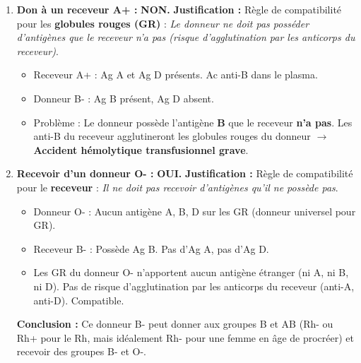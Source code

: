 \documentclass[11pt]{article}
\begin{document}
\begin{exoresolu}
\begin{enumerate}
\begin{itemize}
        \item Système Rhésus (allèles $D$ dominant sur $d$) : Phénotype Rh- ($dd$ seulement) $\rightarrow$ Génotype unique : \textbf{$dd$} (homozygote récessif).
    \end{itemize}
    \item \textbf{Don à un receveur A+ :} \textbf{NON.}
    \textbf{Justification :} Règle de compatibilité pour les \textbf{globules rouges (GR)} : \emph{Le donneur ne doit pas posséder d'antigènes que le receveur n'a pas (risque d'agglutination par les anticorps du receveur)}.
    \begin{itemize}
        \item Receveur A+ : Ag A et Ag D présents. Ac anti-B dans le plasma.
        \item Donneur B- : Ag B présent, Ag D absent.
        \item Problème : Le donneur possède l'antigène \textbf{B} que le receveur \textbf{n'a pas}. Les anti-B du receveur agglutineront les globules rouges du donneur $\rightarrow$ \textbf{Accident hémolytique transfusionnel grave}.
    \end{itemize}
    \item \textbf{Recevoir d'un donneur O- :} \textbf{OUI.}
    \textbf{Justification :} Règle de compatibilité pour le \textbf{receveur} : \emph{Il ne doit pas recevoir d'antigènes qu'il ne possède pas}.
    \begin{itemize}
        \item Donneur O- : Aucun antigène A, B, D sur les GR (donneur universel pour GR).
        \item Receveur B- : Possède Ag B. Pas d'Ag A, pas d'Ag D.
        \item Les GR du donneur O- n'apportent aucun antigène étranger (ni A, ni B, ni D). Pas de risque d'agglutination par les anticorps du receveur (anti-A, anti-D). Compatible.
    \end{itemize}
    \textbf{Conclusion :} Ce donneur B- peut donner aux groupes B et AB (Rh- ou Rh+ pour le Rh, mais idéalement Rh- pour une femme en âge de procréer) et recevoir des groupes B- et O-.
\end{enumerate}
\end{exoresolu}
\end{document}
